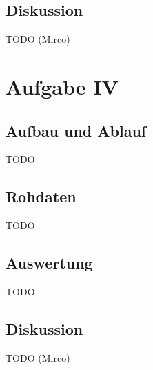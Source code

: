 \documentclass[12pt,a4paper]{article}
\begin{document}
\subsection*{Diskussion}
TODO (Mirco)


\section*{Aufgabe IV}
\subsection*{Aufbau und Ablauf}
TODO

\subsection*{Rohdaten}
TODO

\subsection*{Auswertung}
TODO

\subsection*{Diskussion}
TODO (Mirco)
\end{document}
